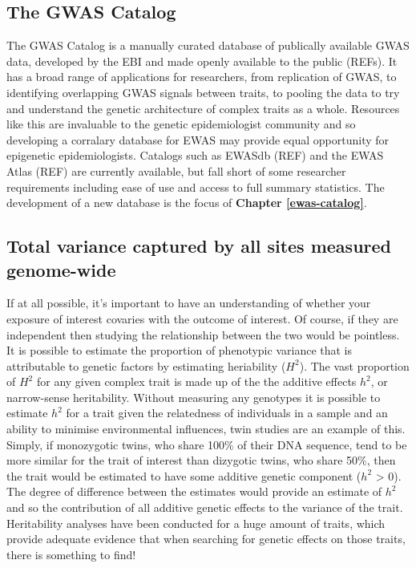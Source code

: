 \documentclass[11pt,twoside]{bristolthesis}
\begin{document}
\hypertarget{gwas-catalog}{%
\subsection{The GWAS Catalog}\label{gwas-catalog}}

The GWAS Catalog is a manually curated database of publically available GWAS data, developed by the EBI and made openly available to the public (REFs). It has a broad range of applications for researchers, from replication of GWAS, to identifying overlapping GWAS signals between traits, to pooling the data to try and understand the genetic architecture of complex traits as a whole. Resources like this are invaluable to the genetic epidemiologist community and so developing a corralary database for EWAS may provide equal opportunity for epigenetic epidemiologists. Catalogs such as EWASdb (REF) and the EWAS Atlas (REF) are currently available, but fall short of some researcher requirements including ease of use and access to full summary statistics. The development of a new database is the focus of \textbf{Chapter \ref{ewas-catalog}}.

\hypertarget{heritability}{%
\subsection{Total variance captured by all sites measured genome-wide}\label{heritability}}

If at all possible, it's important to have an understanding of whether your exposure of interest covaries with the outcome of interest. Of course, if they are independent then studying the relationship between the two would be pointless. It is possible to estimate the proportion of phenotypic variance that is attributable to genetic factors by estimating heriability (\(H^2\)). The vast proportion of \(H^2\) for any given complex trait is made up of the the additive effects \(h^2\), or narrow-sense heritability. Without measuring any genotypes it is possible to estimate \(h^2\) for a trait given the relatedness of individuals in a sample and an ability to minimise environmental influences, twin studies are an example of this. Simply, if monozygotic twins, who share 100\% of their DNA sequence, tend to be more similar for the trait of interest than dizygotic twins, who share 50\%, then the trait would be estimated to have some additive genetic component (\(h^2\) \textgreater{} 0). The degree of difference between the estimates would provide an estimate of \(h^2\) and so the contribution of all additive genetic effects to the variance of the trait. Heritability analyses have been conducted for a huge amount of traits, which provide adequate evidence that when searching for genetic effects on those traits, there is something to find!
\end{document}

